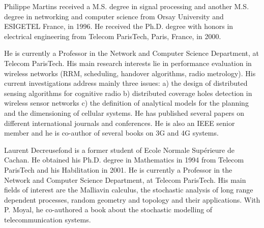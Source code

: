 \documentclass[journal, twoside]{IEEEtran}
\begin{document}
\begin{IEEEbiography}{Philippe Martins}
received a M.S. degree in signal processing and another M.S. degree 
in networking and computer science from Orsay University and ESIGETEL 
France, in 1996. He received the Ph.D. degree with honors in electrical 
engineering from Telecom ParisTech, Paris, France, in 2000.

He is currently a Professor in the Network and Computer Science
Department, at Telecom ParisTech. His main research interests lie in
performance evaluation in wireless networks (RRM, scheduling, handover
algorithms, radio metrology). His current investigations address mainly
three issues: a) the design of distributed sensing algorithms for
cognitive radio b) distributed coverage holes detection in wireless
sensor networks c) the definition of analytical models for the planning
and the dimensioning of cellular systems. He has published several papers 
on different international journals and
conferences. He is also an IEEE senior member and he is co-author of
several books on 3G and 4G systems.
\end{IEEEbiography}

\begin{IEEEbiography}{Laurent Decreusefond}
is a former student of Ecole Normale Sup\'erieure de Cachan. He obtained his Ph.D. 
degree in Mathematics in 1994 from Telecom ParisTech and his Habilitation in 2001. 
He is currently a Professor in the Network and Computer Science
Department, at Telecom ParisTech. His main fields of interest are the Malliavin 
calculus, the stochastic analysis of long range dependent processes, random geometry 
and topology and their applications. With P. Moyal, he co-authored a book about 
the stochastic modelling of telecommunication systems.
\end{IEEEbiography}
\end{document}
